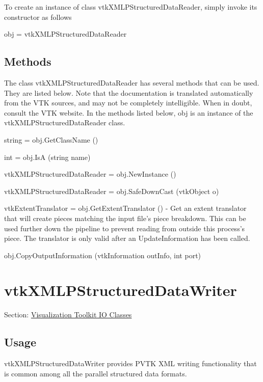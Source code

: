 To create an instance of class vtk\-X\-M\-L\-P\-Structured\-Data\-Reader, simply invoke its constructor as follows \begin{DoxyVerb}  obj = vtkXMLPStructuredDataReader
\end{DoxyVerb}
 \hypertarget{vtkwidgets_vtkxyplotwidget_Methods}{}\subsection{Methods}\label{vtkwidgets_vtkxyplotwidget_Methods}
The class vtk\-X\-M\-L\-P\-Structured\-Data\-Reader has several methods that can be used. They are listed below. Note that the documentation is translated automatically from the V\-T\-K sources, and may not be completely intelligible. When in doubt, consult the V\-T\-K website. In the methods listed below, {\ttfamily obj} is an instance of the vtk\-X\-M\-L\-P\-Structured\-Data\-Reader class. 
\begin{DoxyItemize}
\item {\ttfamily string = obj.\-Get\-Class\-Name ()}  
\item {\ttfamily int = obj.\-Is\-A (string name)}  
\item {\ttfamily vtk\-X\-M\-L\-P\-Structured\-Data\-Reader = obj.\-New\-Instance ()}  
\item {\ttfamily vtk\-X\-M\-L\-P\-Structured\-Data\-Reader = obj.\-Safe\-Down\-Cast (vtk\-Object o)}  
\item {\ttfamily vtk\-Extent\-Translator = obj.\-Get\-Extent\-Translator ()} -\/ Get an extent translator that will create pieces matching the input file's piece breakdown. This can be used further down the pipeline to prevent reading from outside this process's piece. The translator is only valid after an Update\-Information has been called.  
\item {\ttfamily obj.\-Copy\-Output\-Information (vtk\-Information out\-Info, int port)}  
\end{DoxyItemize}\hypertarget{vtkio_vtkxmlpstructureddatawriter}{}\section{vtk\-X\-M\-L\-P\-Structured\-Data\-Writer}\label{vtkio_vtkxmlpstructureddatawriter}
Section\-: \hyperlink{sec_vtkio}{Visualization Toolkit I\-O Classes} \hypertarget{vtkwidgets_vtkxyplotwidget_Usage}{}\subsection{Usage}\label{vtkwidgets_vtkxyplotwidget_Usage}
vtk\-X\-M\-L\-P\-Structured\-Data\-Writer provides P\-V\-T\-K X\-M\-L writing functionality that is common among all the parallel structured data formats.

